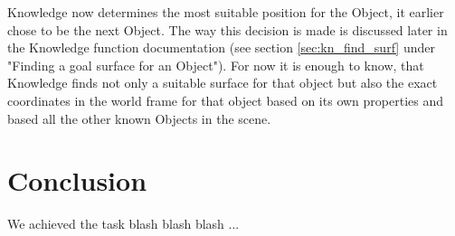 \documentclass[main.tex]{subfiles}
\begin{document}
Knowledge now determines the most suitable position for the Object, it earlier chose to be the next Object. The way this decision is made is discussed later in the Knowledge function documentation (see section \ref{sec:kn_find_surf} under "Finding a goal surface for an Object"). For now it is enough to know, that Knowledge finds not only a suitable surface for that object but also the exact coordinates in the world frame for that object based on its own properties and based all the other known Objects in the scene.
	
	
	
	
	
	
	
	
	
	
	\section{Conclusion}

	We achieved the task blash blash blash ...
	
	
	\endgroup
	
\end{document}
